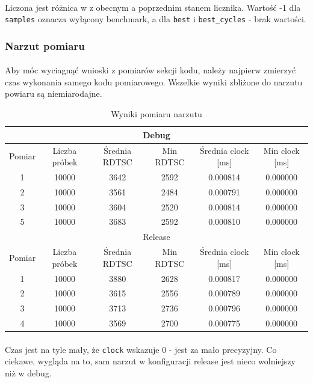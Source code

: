 \documentclass[12pt]{report}
\begin{document}
	\paragraph{}
	Liczona jest różnica w z obecnym a poprzednim stanem licznika. Wartość -1 dla \verb|samples| oznacza wyłącony benchmark, a dla \verb|best| i \verb|best_cycles| - brak wartości.
	
	\subsubsection{Narzut pomiaru}
	\paragraph{}
	Aby móc wyciagnąć wnioski z pomiarów sekcji kodu, należy najpierw zmierzyć czas wykonania samego kodu pomiarowego. Wszelkie wyniki zbliżone do narzutu powiaru są niemiarodajne.
	
	\begin{table}[h]
		\centering
		\caption{Wyniki pomiaru narzutu}
		\begin{tabular}{|c|c|c|c|c|c|} \hline
			\multicolumn{6}{|c|}{Debug} \\\hline
			Pomiar  & Liczba próbek & Średnia RDTSC & Min RDTSC & Średnia clock [ms] & Min clock [ms] \\\hline
			1 & 10000 & 3642 & 2592 & 0.000814 & 0.000000 \\\hline
			2 & 10000 & 3561 & 2484 & 0.000791 & 0.000000 \\\hline
			3 & 10000 & 3604 & 2520 & 0.000814 & 0.000000 \\\hline
			5 & 10000 & 3683 & 2592 & 0.000810 & 0.000000 \\\hline
			\hline
			\multicolumn{6}{|c|}{Release} \\\hline
			Pomiar  & Liczba próbek & Średnia RDTSC & Min RDTSC & Średnia clock [ms] & Min clock [ms] \\\hline
			1 & 10000 & 3880 & 2628 & 0.000817 & 0.000000 \\\hline
			2 & 10000 & 3615 & 2556 & 0.000789 & 0.000000 \\\hline
			3 & 10000 & 3713 & 2736 & 0.000796 & 0.000000 \\\hline
			4 & 10000 & 3569 & 2700 & 0.000775 & 0.000000 \\\hline
		\end{tabular}
	\end{table}

	\paragraph{}
	Czas jest na tyle mały, że \verb|clock| wskazuje 0 - jest za mało precyzyjny.
	Co ciekawe, wygląda na to, sam narzut w konfiguracji release jest nieco wolniejszy niż w debug.
	
\end{document}
